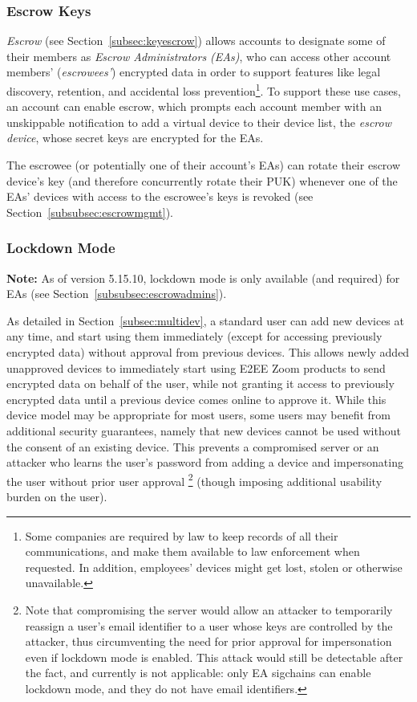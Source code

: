 \subsubsection{Escrow Keys}
\label{subsubsec:escrowkeys}
\emph{Escrow} (see Section~\ref{subsec:keyescrow}) allows accounts to designate some of their
members as \emph{Escrow Administrators (EAs)}, who can access other account members'
(\emph{escrowees'}) encrypted data in order to support features like legal discovery, retention, and
accidental loss prevention\footnote{Some companies are required by law to keep records of all their
communications, and make them available to law enforcement when requested. In addition, employees'
devices might get lost, stolen or otherwise unavailable.}. To support these use cases, an account
can enable escrow, which prompts each account member with an unskippable notification to add a
virtual device to their device list, the \emph{escrow device}, whose secret keys are encrypted for
the EAs.

The escrowee (or potentially one of their account's EAs) can rotate their escrow device's key (and
therefore concurrently rotate their PUK) whenever one of the EAs' devices with access to the
escrowee's keys is revoked (see Section~\ref{subsubsec:escrowmgmt}).

\subsubsection{Lockdown Mode}
\label{subsubsec:lockdownmode}
\textbf{Note:} As of version 5.15.10, lockdown mode is only available (and required) for EAs (see
Section~\ref{subsubsec:escrowadmins}).

As detailed in Section~\ref{subsec:multidev}, a standard user can add new devices at any time, and
start using them immediately (except for accessing previously encrypted data) without approval from
previous devices. This allows newly added unapproved devices to immediately start using E2EE Zoom
products to send encrypted data on behalf of the user, while not granting it access to previously
encrypted data until a previous device comes online to approve it. While this device model may be
appropriate for most users, some users may benefit from additional security guarantees, namely that
new devices cannot be used without the consent of an existing device. This prevents a compromised
server or an attacker who learns the user's password from adding a device and impersonating the user
without prior user approval%
%
\footnote{ Note that compromising the server would allow an attacker to temporarily reassign a
user's email identifier to a user whose keys are controlled by the attacker, thus circumventing the
need for prior approval for impersonation even if lockdown mode is enabled. This attack would still
be detectable after the fact, and currently is not applicable: only EA sigchains can enable lockdown
mode, and they do not have email identifiers.}%
%
(though imposing additional usability burden on the user).

